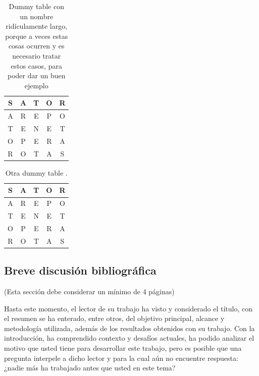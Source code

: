 \begin{table}[hbtp]
	\centering
	\begin{tabular}{|c|c|c|c|c|} \hline
        S & A & T & O & R\\ \hline
        A & R & E & P & O\\ \hline
        T & E & N & E & T\\ \hline
        O & P & E & R & A\\ \hline
        R & O & T & A & S\\ \hline
    \end{tabular}
    
    \caption[Dummy table de nombre largo]{Dummy table con un nombre ridículamente largo, porque a veces estas cosas ocurren y es necesario tratar estos casos, para poder dar un buen ejemplo}
    \label{tab:dummytable2}
\end{table}

\begin{table}[htbp]
	\centering
	\begin{tabular}{|c|c|c|c|c|} \hline
        S & A & T & O & R\\ \hline
        A & R & E & P & O\\ \hline
        T & E & N & E & T\\ \hline
        O & P & E & R & A\\ \hline
        R & O & T & A & S\\ \hline
    \end{tabular}
    
    \caption[Nombre corto]{Otra dummy table \parencite{Navarro-Prieto}.}
    \label{tab:dummytable3}
\end{table}

\subsection{Breve discusión bibliográfica}

(Esta sección debe considerar un mínimo de 4 páginas)

Hasta este momento, el lector de su trabajo  ha visto y considerado el título, con el resumen se ha enterado, entre otros, del objetivo principal, alcance y metodología utilizada, además de los resultados obtenidos con su trabajo. Con la introducción, ha comprendido contexto y desafíos actuales, ha podido analizar el motivo que usted tiene para desarrollar este trabajo, pero es posible que una pregunta interpele a dicho lector y para la cual aún no encuentre respuesta: ¿nadie más ha trabajado antes que usted en este tema?


